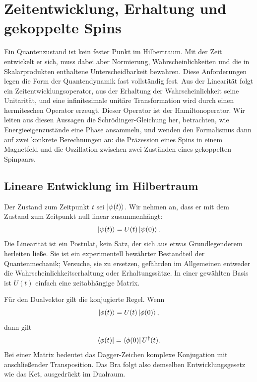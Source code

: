 \chapter{Zeitentwicklung, Erhaltung und gekoppelte Spins}

Ein Quantenzustand ist kein fester Punkt im Hilbertraum. Mit der Zeit entwickelt er sich, muss dabei aber Normierung, Wahrscheinlichkeiten und die in Skalarprodukten enthaltene Unterscheidbarkeit bewahren. Diese Anforderungen legen die Form der Quantendynamik fast vollständig fest. Aus der Linearität folgt ein Zeitentwicklungsoperator, aus der Erhaltung der Wahrscheinlichkeit seine Unitarität, und eine infinitesimale unitäre Transformation wird durch einen hermiteschen Operator erzeugt. Dieser Operator ist der Hamiltonoperator. Wir leiten aus diesen Aussagen die Schr\"odinger-Gleichung her, betrachten, wie Energieeigenzustände eine Phase ansammeln, und wenden den Formalismus dann auf zwei konkrete Berechnungen an: die Präzession eines Spins in einem Magnetfeld und die Oszillation zwischen zwei Zuständen eines gekoppelten Spinpaars.

\section{Lineare Entwicklung im Hilbertraum}

Der Zustand zum Zeitpunkt \(t\) sei \(\left\lvert\psi(t)\right\rangle\). Wir nehmen an, dass er mit dem Zustand zum Zeitpunkt null linear zusammenhängt:
\begin{equation}
\left\lvert\psi(t)\right\rangle=U(t)\left\lvert\psi(0)\right\rangle.
\end{equation}
Die Linearität ist ein Postulat, kein Satz, der sich aus etwas Grundlegenderem herleiten ließe. Sie ist ein experimentell bewährter Bestandteil der Quantenmechanik; Versuche, sie zu ersetzen, gefährden im Allgemeinen entweder die Wahrscheinlichkeitserhaltung oder Erhaltungssätze. In einer gewählten Basis ist \(U(t)\) einfach eine zeitabhängige Matrix.

Für den Dualvektor gilt die konjugierte Regel. Wenn
\begin{equation}
\left\lvert\phi(t)\right\rangle=U(t)\left\lvert\phi(0)\right\rangle,
\end{equation}
dann gilt
\begin{equation}
\left\langle\phi(t)\right\rvert=\left\langle\phi(0)\right\rvert U^\dagger(t).
\end{equation}
Bei einer Matrix bedeutet das Dagger-Zeichen komplexe Konjugation mit anschließender Transposition. Das Bra folgt also demselben Entwicklungsgesetz wie das Ket, ausgedrückt im Dualraum.

